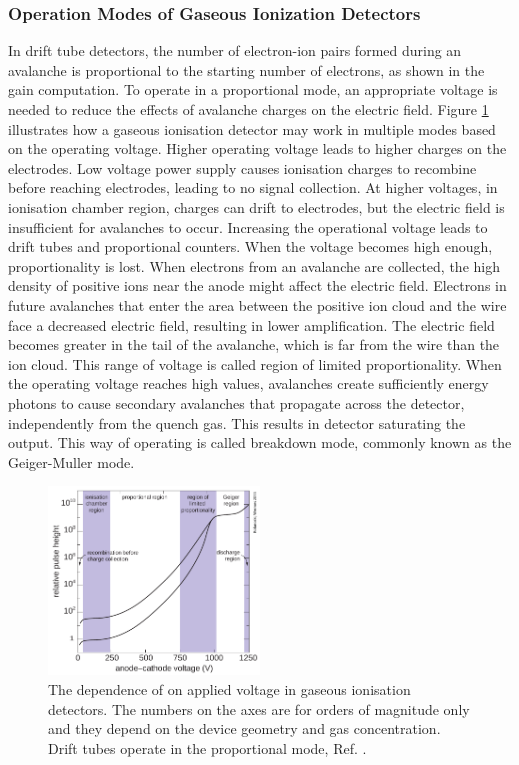 \subsubsection{Operation Modes of Gaseous Ionization Detectors}
In drift tube detectors, the number of electron-ion pairs formed during an avalanche is 
proportional to the starting number of electrons, as shown in the gain computation. To 
operate in a proportional mode, an appropriate voltage is needed to reduce the effects 
of avalanche charges on the electric field. Figure \ref{fig:gaseous} illustrates how a 
gaseous ionisation detector may work in multiple modes based on the operating voltage. Higher operating 
voltage leads to higher charges on the electrodes. Low voltage power supply causes ionisation charges to recombine 
before reaching electrodes, leading to no signal collection. At higher voltages, in ionisation chamber 
region, charges can drift to electrodes, but the electric field is insufficient for avalanches to occur. 
Increasing the operational voltage leads to drift tubes and proportional counters. When the voltage 
becomes high enough, proportionality is lost. When electrons from an avalanche are collected, 
the high density of positive ions near the anode might affect the electric field. 
Electrons in future avalanches that enter the area between the positive ion cloud and the wire face a 
decreased electric field, resulting in lower amplification. The electric field becomes greater in the 
tail of the avalanche, which is far from the wire than the ion cloud. This range of voltage is called region of 
limited proportionality. When the operating voltage reaches high values, 
avalanches create sufficiently energy photons to cause secondary avalanches 
that propagate across the detector, independently from the quench gas. 
This results in detector saturating the output. This way of operating is 
called breakdown mode, commonly known as the Geiger-Muller mode.
\begin{figure}[!h]
    \centering
    \includegraphics[width =0.5\textwidth]{figures/png/Screenshot_20240330_203416.png}
    \caption[The dependence of particle gain on applied voltage in gaseous ionisation detectors.]
    {The dependence of 
%
      on applied voltage in gaseous ionisation detectors. 
      The numbers on the axes are for orders of magnitude only and they depend on the device geometry
      and gas concentration. 
    Drift tubes operate in the proportional mode, Ref. \cite{kola}.}
    \label{fig:gaseous}
    \end{figure}
